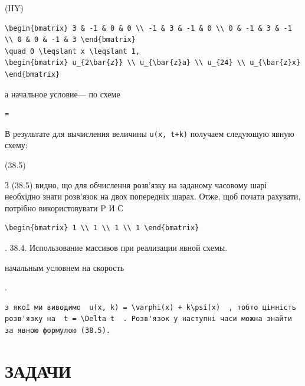 \documentclass[
  ukrainian,
]{article}
\begin{document}
(HY)

\begin{verbatim}
\begin{bmatrix} 3 & -1 & 0 & 0 \\ -1 & 3 & -1 & 0 \\ 0 & -1 & 3 & -1 \\ 0 & 0 & -1 & 3 \end{bmatrix}
\quad 0 \leqslant x \leqslant 1,
\begin{bmatrix} u_{2\bar{z}} \\ u_{\bar{z}a} \\ u_{24} \\ u_{\bar{z}x} \end{bmatrix}
\end{verbatim}

а начальное условие--- по схеме

\begin{verbatim}
=
\end{verbatim}

В результате для вычисления величины \texttt{u(x,\ t+k)} получаем
следующую явную схему:

(38.5)

З (38.5) видно, що для обчислення розв'язку на заданому часовому шарі
необхідно знати розв'язок на двох попередніх шарах. Отже, щоб почати
рахувати, потрібно використовувати P И С

\begin{verbatim}
\begin{bmatrix} 1 \\ 1 \\ 1 \\ 1 \end{bmatrix}
\end{verbatim}

. 38.4. Использование массивов при реализации явной схемы.

начальным условнем на скорость

.

\begin{verbatim}
з якої ми виводимо  u(x, k) = \varphi(x) + k\psi(x)  , тобто цінність розв'язку на  t = \Delta t  . Розв'язок у наступні часи можна знайти за явною формулою (38.5).
\end{verbatim}

\section{ЗАДАЧИ}\label{ux437ux430ux434ux430ux447ux438-7}
\end{document}
